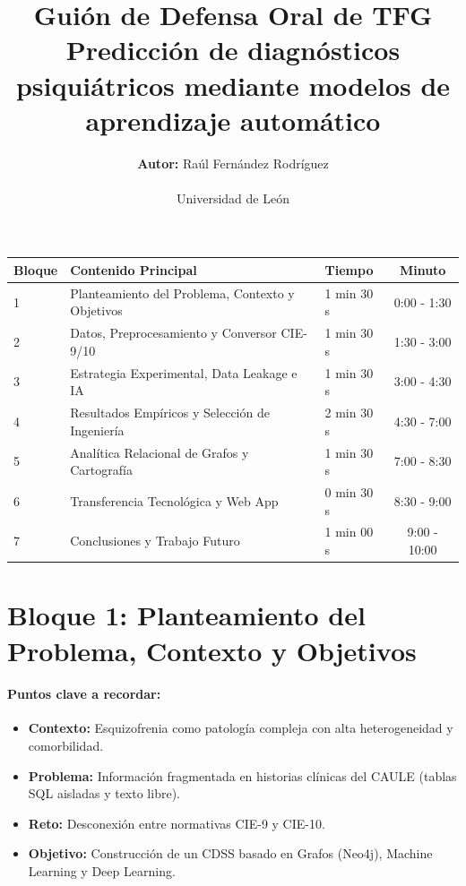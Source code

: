 \documentclass[11pt, a4paper]{article}
\title{%
  \vspace{-1cm}
  \Huge \textbf{\color{primaryColor}Guión de Defensa Oral de TFG} \\
  \Large \color{secondaryColor}Predicción de diagnósticos psiquiátricos mediante modelos de aprendizaje automático
}
\author{\textbf{Autor:} Raúl Fernández Rodríguez \\ \\ \small Universidad de León}
\date{}
\newcommand{\timebadge}[2]{%
  \tcbox[
    on line,
    colback=timeBadge,
    colframe=speechBorder,
    arc=2mm,
    boxrule=0.5pt,
    top=1mm, bottom=1mm, left=2mm, right=2mm
  ]{\small \faClock\ \textbf{#1} \quad \textcolor{gray}{(#2)}}%
}
\begin{document}
\maketitle
\vspace{-1cm}

\begin{table}[h!]
\centering
\small
\begin{tabular}{lllc}
\toprule
\textbf{Bloque} & \textbf{Contenido Principal} & \textbf{Tiempo} & \textbf{Minuto} \\
\midrule
1 & Planteamiento del Problema, Contexto y Objetivos & 1 min 30 s & 0:00 - 1:30 \\
2 & Datos, Preprocesamiento y Conversor CIE-9/10 & 1 min 30 s & 1:30 - 3:00 \\
3 & Estrategia Experimental, Data Leakage e IA & 1 min 30 s & 3:00 - 4:30 \\
4 & Resultados Empíricos y Selección de Ingeniería & 2 min 30 s & 4:30 - 7:00 \\
5 & Analítica Relacional de Grafos y Cartografía & 1 min 30 s & 7:00 - 8:30 \\
6 & Transferencia Tecnológica y Web App & 0 min 30 s & 8:30 - 9:00 \\
7 & Conclusiones y Trabajo Futuro & 1 min 00 s & 9:00 - 10:00 \\
\bottomrule
\end{tabular}
\end{table}

\clearpage
\section{Bloque 1: Planteamiento del Problema, Contexto y Objetivos}
\timebadge{1 min 30 s}{Minuto 0:00 - 1:30}

\paragraph{Puntos clave a recordar:}
\begin{itemize}[noitemsep]
    \item \textbf{Contexto:} Esquizofrenia como patología compleja con alta heterogeneidad y comorbilidad.
    \item \textbf{Problema:} Información fragmentada en historias clínicas del CAULE (tablas SQL aisladas y texto libre).
    \item \textbf{Reto:} Desconexión entre normativas CIE-9 y CIE-10.
    \item \textbf{Objetivo:} Construcción de un CDSS basado en Grafos (Neo4j), Machine Learning y Deep Learning.
\end{itemize}
\end{document}
